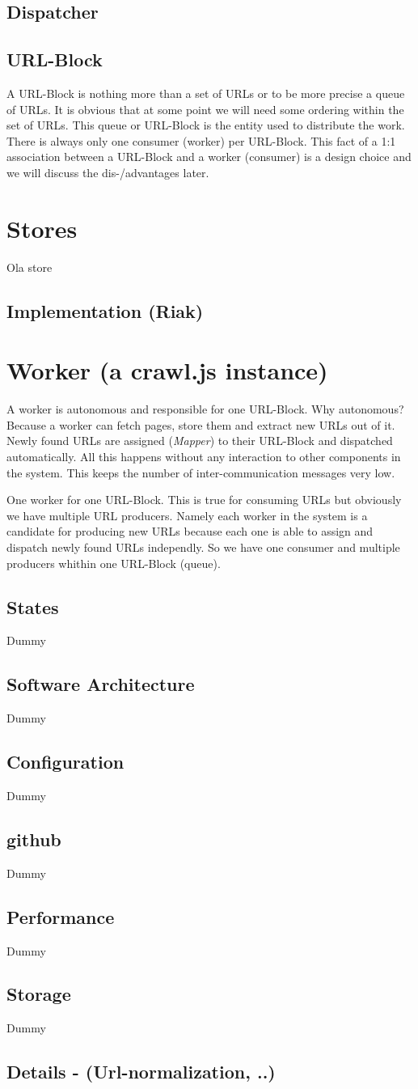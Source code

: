 \subsection{Dispatcher}

\subsection{URL-Block}
A URL-Block is nothing more than a set of URLs or to be more precise a queue of URLs. It is obvious that at some point we will need some ordering within the set of URLs.
This queue or URL-Block is the entity used to distribute the work. There is always only one consumer (worker) per URL-Block.
This fact of a 1:1 association between a URL-Block and a worker (consumer) is a design choice and we will discuss the dis-/advantages later.

\section{Stores}
Ola store
\subsection{Implementation (Riak)}

\section{Worker (a crawl.js instance)}
A worker is autonomous and responsible for one URL-Block. Why autonomous? Because a worker can fetch pages, store them and extract new URLs out of it. Newly found URLs are assigned (\emph{Mapper}) to their URL-Block and dispatched automatically. All this happens without any interaction to other components in the system. This keeps the number of inter-communication messages very low.

One worker for one URL-Block. This is true for consuming URLs but obviously we have multiple URL producers. Namely each worker in the system is a candidate for producing new URLs because each one is able to assign and dispatch newly found URLs independly. So we have one consumer and multiple producers whithin one URL-Block (queue).
\subsection{States}
Dummy
\subsection{Software Architecture}
Dummy
\subsection{Configuration}
Dummy
\subsection{github}
Dummy
\subsection{Performance}
Dummy
\subsection{Storage}
Dummy
\subsection{Details - (Url-normalization, ..)}

